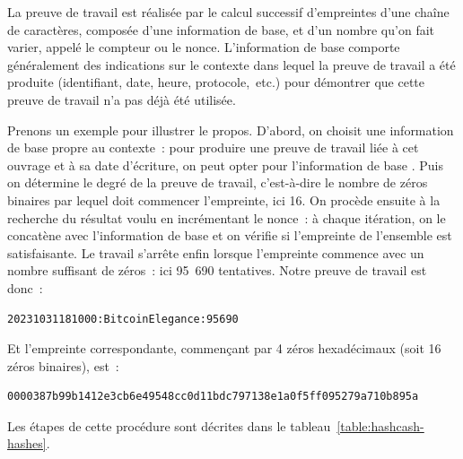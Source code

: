 La preuve de travail est réalisée par le calcul successif d'empreintes d'une chaîne de caractères, composée d'une information de base, et d'un nombre qu'on fait varier, appelé le compteur ou le nonce. L'information de base comporte généralement des indications sur le contexte dans lequel la preuve de travail a été produite (identifiant, date, heure, protocole,~etc.) pour démontrer que cette preuve de travail n'a pas déjà été utilisée.

Prenons un exemple pour illustrer le propos. D'abord, on choisit une information de base propre au contexte~: pour produire une preuve de travail liée à cet ouvrage et à sa date d'écriture, on peut opter pour l'information de base . Puis on détermine le degré de la preuve de travail, c'est-à-dire le nombre de zéros binaires par lequel doit commencer l'empreinte, ici 16. On procède ensuite à la recherche du résultat voulu en incrémentant le nonce~: à chaque itération, on le concatène avec l'information de base et on vérifie si l'empreinte de l'ensemble est satisfaisante. Le travail s'arrête enfin lorsque l'empreinte commence avec un nombre suffisant de zéros~: ici 95~690 tentatives. Notre preuve de travail est donc~:

\begin{Verbatim}[fontsize=\footnotesize]
20231031181000:BitcoinElegance:95690
\end{Verbatim}

Et l'empreinte correspondante, commençant par 4 zéros hexadécimaux (soit 16 zéros binaires), est~:

\begin{Verbatim}[fontsize=\footnotesize]
0000387b99b1412e3cb6e49548cc0d11bdc797138e1a0f5ff095279a710b895a
\end{Verbatim}

Les étapes de cette procédure sont décrites dans le tableau~\ref{table:hashcash-hashes}.

